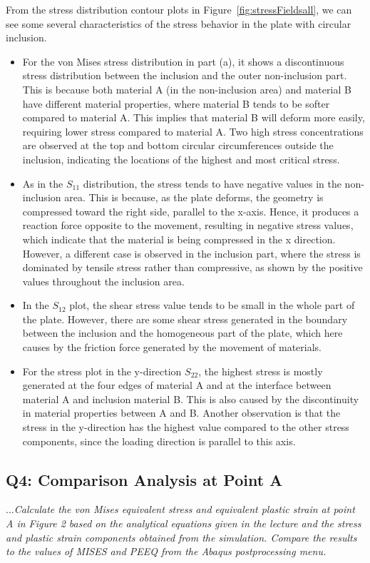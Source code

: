 \documentclass[12pt]{article}
\begin{document}
\hspace{2em}From the stress distribution contour plots in Figure~\ref{fig:stressFieldsall},
we can see some several characteristics of the stress behavior in the plate with circular inclusion.
\begin{itemize}
    \item For the von Mises stress distribution in part (a), it shows a discontinuous stress distribution between the inclusion 
    and the outer non-inclusion part. This is because both material A (in the non-inclusion area) and material B have different 
    material properties, where material B tends to be softer compared to material A. This implies that material B will deform more 
    easily, requiring lower stress compared to material A. Two high stress concentrations are observed at the top and bottom circular 
    circumferences outside the inclusion, indicating the locations of the highest and most critical stress.
    \item As in the $S_{11}$ distribution, the stress tends to have negative values in the non-inclusion area. 
    This is because, as the plate deforms, the geometry is compressed toward the right side, parallel to the x-axis. Hence, 
    it produces a reaction force opposite to the movement, resulting in negative stress values, which indicate that the material 
    is being compressed in the x direction. However, a different case is observed in the inclusion part, where the stress is 
    dominated by tensile stress rather than compressive, as shown by the positive values throughout the inclusion area.
    \item In the $S_{12}$ plot, the shear stress value tends to be small in the whole part of the plate. However, there
    are some shear stress generated in the boundary between the inclusion and the homogeneous part of the
    plate, which here causes by the friction force generated by the movement of materials. 
    \item For the stress plot in the y-direction $S_{22}$, the highest stress is mostly generated at the four edges of material A 
    and at the interface between material A and inclusion material B. 
    This is also caused by the discontinuity in material properties between A and B. 
    Another observation is that the stress in the y-direction has the highest value compared to the other stress components, 
    since the loading direction is parallel to this axis.
\end{itemize}

\newpage
\subsection*{Q4: Comparison Analysis at Point A}
\textit{$\dots$Calculate the von Mises equivalent stress and equivalent plastic strain at point A in Figure 2
based on the analytical equations given in the lecture and the stress and plastic strain
components obtained from the simulation. Compare the results to the values of MISES and
PEEQ from the Abaqus postprocessing menu.}
\vspace{1em}
\end{document}
